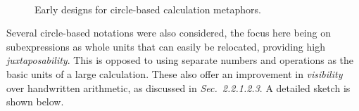 \documentclass[12pt,twoside,notitlepage,xetex]{report}
\begin{document}
\begin{center}
\begin{figure}[H]
\begin{center}
{{\begin{center}
\end{center}}}
\\
\end{center}
\caption{Early designs for circle-based calculation metaphors.}
\label{fig:Circs1}
\end{figure}
\end{center}

Several circle-based notations were also considered, the focus here being on subexpressions as whole units that can easily be relocated, providing high \emph{juxtaposability}. This is opposed to using separate numbers and operations as the basic units of a large calculation.  These also offer an improvement in \emph{visibility} over handwritten arithmetic, as discussed in \emph{Sec.~2.2.1.2.3}.  A detailed sketch is shown below.
\end{document}

